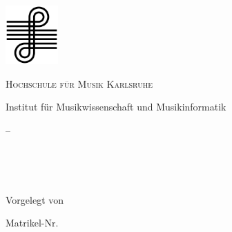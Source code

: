 
\begin{titlepage}
	\centering
	
	\includegraphics[width=0.15\textwidth]{../Grafiken/Logo_HfM_KA}\par
	
	\vspace{0.6cm}
	
	{\scshape\LARGE Hochschule für Musik Karlsruhe \par
		\vspace{0.2cm}
		\large Institut für Musikwissenschaft und Musikinformatik\par}
	\vspace{1cm}
	
	{\Large \modulname –\modulkuerzel\par}
	
	\vspace{4.5cm}
	
	{\Huge\textbf{\titel}}\par
		{\huge\textsl{\untertitelI\\}}\par
		{\huge\textsl{\untertitelII\\}}
	\vspace{4.5cm}

	{Vorgelegt von\par
		\textsc{\verfasser} \par
		\vspace{0.4cm}
		Matrikel-Nr.\matrikelnummer \par
		\adresse \par
		\email \par}
	\vspace{0.3cm}
	
	{\large \abgabedatum}
\end{titlepage}